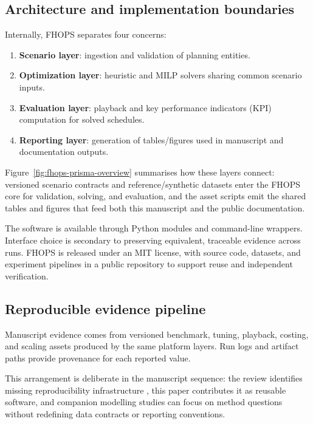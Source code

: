 \subsection{Architecture and implementation boundaries}
Internally, FHOPS separates four concerns:
\begin{enumerate}
  \item \textbf{Scenario layer}: ingestion and validation of planning entities.
  \item \textbf{Optimization layer}: heuristic and MILP solvers sharing common scenario inputs.
  \item \textbf{Evaluation layer}: playback and key performance indicators (KPI) computation for solved schedules.
  \item \textbf{Reporting layer}: generation of tables/figures used in manuscript and documentation outputs.
\end{enumerate}

Figure~\ref{fig:fhops-prisma-overview} summarises how these layers connect: versioned scenario contracts and reference/synthetic datasets enter the FHOPS core for validation, solving, and evaluation, and the asset scripts emit the shared tables and figures that feed both this manuscript and the public documentation.



The software is available through Python modules and command-line wrappers. Interface choice is secondary to preserving equivalent, traceable evidence across runs. FHOPS is released under an MIT license, with source code, datasets, and experiment pipelines in a public repository to support reuse and independent verification.

\subsection{Reproducible evidence pipeline}
Manuscript evidence comes from versioned benchmark, tuning, playback, costing, and scaling assets produced by the same platform layers. Run logs and artifact paths provide provenance for each reported value.

This arrangement is deliberate in the manuscript sequence: the review identifies missing reproducibility infrastructure \cite{jaffray2026systematic}, this paper contributes it as reusable software, and companion modelling studies can focus on method questions without redefining data contracts or reporting conventions.
